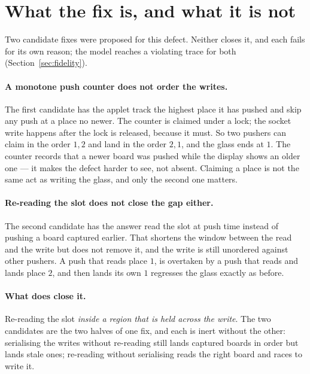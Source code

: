 \documentclass[a4paper,10pt,fleqn]{article}
\begin{document}
\section{What the fix is, and what it is not}
\label{sec:oblig}

Two candidate fixes were proposed for this defect. Neither closes it, and each
fails for its own reason; the model reaches a violating trace for both
(Section~\ref{sec:fidelity}).

\paragraph{A monotone push counter does not order the writes.}
The first candidate has the applet track the highest place it has pushed and
skip any push at a place no newer. The counter is claimed under a lock; the
socket write happens after the lock is released, because it must. So two pushers
can claim in the order $1, 2$ and land in the order $2, 1$, and the glass ends
at $1$. The counter records that a newer board was pushed while the display
shows an older one --- it makes the defect harder to see, not absent. Claiming a
place is not the same act as writing the glass, and only the second one matters.

\paragraph{Re-reading the slot does not close the gap either.}
The second candidate has the answer read the slot at push time instead of
pushing a board captured earlier. That shortens the window between the read and
the write but does not remove it, and the write is still unordered against other
pushers. A push that reads place $1$, is overtaken by a push that reads and
lands place $2$, and then lands its own $1$ regresses the glass exactly as
before.

\paragraph{What does close it.}
Re-reading the slot \emph{inside a region that is held across the write}. The
two candidates are the two halves of one fix, and each is inert without the
other: serialising the writes without re-reading still lands captured boards in
order but lands stale ones; re-reading without serialising reads the right board
and races to write it.
\end{document}
